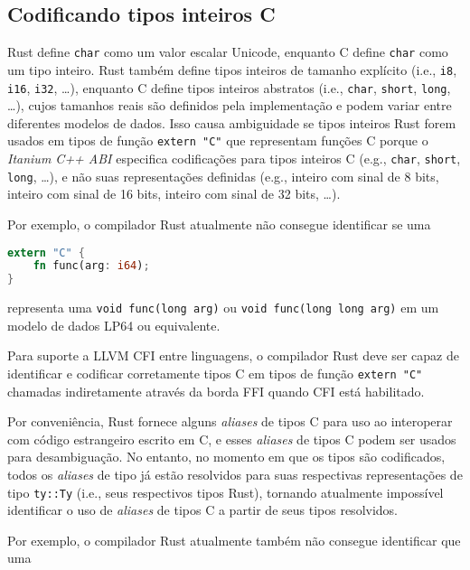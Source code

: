 \documentclass{article}
\begin{document}
\subsection{Codificando tipos inteiros C}

Rust define \texttt{char} como um valor escalar Unicode, enquanto C define \texttt{char} como um tipo inteiro. Rust também define tipos inteiros de tamanho explícito (i.e., \texttt{i8}, \texttt{i16}, \texttt{i32}, …), enquanto C define tipos inteiros abstratos (i.e., \texttt{char}, \texttt{short}, \texttt{long}, …), cujos tamanhos reais são definidos pela implementação e podem variar entre diferentes modelos de dados. Isso causa ambiguidade se tipos inteiros Rust forem usados em tipos de função \texttt{extern "C"} que representam funções C porque o \textit{Itanium C++ ABI} especifica codificações para tipos inteiros C (e.g., \texttt{char}, \texttt{short}, \texttt{long}, …), e não suas representações definidas (e.g., inteiro com sinal de 8 bits, inteiro com sinal de 16 bits, inteiro com sinal de 32 bits, …).

Por exemplo, o compilador Rust atualmente não consegue identificar se uma

\begin{lstlisting}[language=Rust, caption={Exemplo de função extern "C"\ usando um tipo inteiro Rust.}]
extern "C" {
    fn func(arg: i64);
}
\end{lstlisting}

representa uma \texttt{void func(long arg)} ou \texttt{void func(long long arg)} em um modelo de dados LP64 ou equivalente.

Para suporte a LLVM CFI entre linguagens, o compilador Rust deve ser capaz de identificar e codificar corretamente tipos C em tipos de função \texttt{extern "C"} chamadas indiretamente através da borda FFI quando CFI está habilitado.

Por conveniência, Rust fornece alguns \textit{aliases} de tipos C para uso ao interoperar com código estrangeiro escrito em C, e esses \textit{aliases} de tipos C podem ser usados para desambiguação. No entanto, no momento em que os tipos são codificados, todos os \textit{aliases} de tipo já estão resolvidos para suas respectivas representações de tipo \texttt{ty::Ty} (i.e., seus respectivos tipos Rust), tornando atualmente impossível identificar o uso de \textit{aliases} de tipos C a partir de seus tipos resolvidos.

Por exemplo, o compilador Rust atualmente também não consegue identificar que uma
\end{document}
